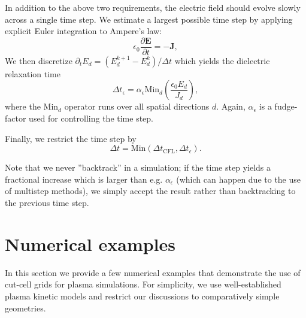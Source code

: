 \documentclass[3p]{elsarticle}
\begin{document}
In addition to the above two requirements, the electric field should evolve slowly across a single time step. We estimate a largest possible time step by applying explicit Euler integration to Ampere's law: 
\begin{equation}
  \epsilon_0\frac{\partial \bm{E}}{\partial t} = -\bm{J},
\end{equation}
We then discretize $\partial_tE_d = (E_d^{k+1}-E_d^k)/\Delta t$ which yields the dielectric relaxation time
\begin{equation}
  \Delta t_\epsilon = \alpha_{\epsilon}\text{Min}_d\left(\frac{\epsilon_0E_d}{J_d}\right),
\end{equation}
where the $\text{Min}_d$ operator runs over all spatial directions $d$. Again, $\alpha_{\epsilon}$ is a fudge-factor used for controlling the time step.

Finally, we restrict the time step by 
\begin{equation}
  \Delta t = \text{Min}\left(\Delta t_{\text{CFL}}, \Delta t_\epsilon\right).
\end{equation}

Note that we never ''backtrack'' in a simulation; if the time step yields a fractional increase which is larger than e.g. $\alpha_\epsilon$ (which can happen due to the use of multistep methods), we simply accept the result rather than backtracking to the previous time step.


\section{Numerical examples}
\label{sec:examples}
In this section we provide a few numerical examples that demonstrate the use of cut-cell grids for plasma simulations. For simplicity, we use well-established plasma kinetic models and restrict our discussions to comparatively simple geometries. %
\end{document}
